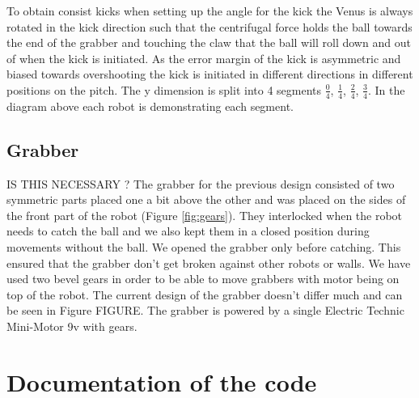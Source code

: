 \documentclass[a4paper,12pt]{article}
\begin{document}
To obtain consist kicks when setting up the angle for the kick the Venus is always rotated in the kick direction such that the centrifugal force holds the ball towards the end of the grabber and touching the claw that the ball will roll down and out of when the kick is initiated. As the error margin of the kick is asymmetric and biased towards overshooting the kick is initiated in different directions in different positions on the pitch. The y dimension is split into 4 segments $\frac{0}{4}$, $\frac{1}{4}$, $\frac{2}{4}$, $\frac{3}{4}$. In the diagram above each robot is demonstrating each segment.  

\subsection{Grabber}
IS THIS NECESSARY ?
The grabber for the previous design consisted of two symmetric parts placed one a bit above the other and was placed on the sides of the front part of the robot (Figure \ref{fig:gears}). They interlocked when the robot needs to catch the ball and we also kept them in a closed position during movements without the ball. We opened the grabber only before catching. This ensured that the grabber don't get broken against other robots or walls. We have used two bevel gears in order to be able to move grabbers with motor being on top of the robot. The current design of the grabber doesn't differ much and can be seen in Figure FIGURE. The grabber is powered by a single Electric Technic Mini-Motor 9v with gears.

\section{Documentation of the code}
\end{document}
